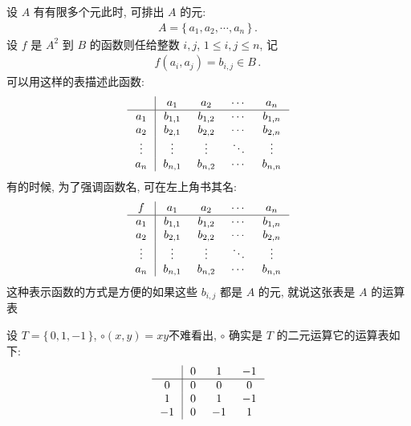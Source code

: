 \begin{remark}
    设 $A$ 有有限多个元\period 此时, 可排出 $A$ 的元:
    \begin{align*}
        A = \{\, a_1, a_2, \cdots, a_n \,\} \period
    \end{align*}
    设 $f$ 是 $A^2$ 到 $B$ 的函数\period 则任给整数 $i,j$, $1 \leq i,j \leq n$, 记
    \begin{align*}
        f(a_i, a_j) = b_{i,j} \in B \period
    \end{align*}
    可以用这样的表描述此函数:
    \begin{align*}
        \arraycolsep=0.25cm
        \begin{array}{c|cccc}
            \      & a_1     & a_2     & \cdots & a_n     \\ \hline
            a_1    & b_{1,1} & b_{1,2} & \cdots & b_{1,n} \\
            a_2    & b_{2,1} & b_{2,2} & \cdots & b_{2,n} \\
            \vdots & \vdots  & \vdots  & \ddots & \vdots  \\
            a_n    & b_{n,1} & b_{n,2} & \cdots & b_{n,n} \\
        \end{array}
    \end{align*}
    有的时候, 为了强调函数名, 可在左上角书其名:
    \begin{align*}
        \arraycolsep=0.25cm
        \begin{array}{c|cccc}
            f      & a_1     & a_2     & \cdots & a_n     \\ \hline
            a_1    & b_{1,1} & b_{1,2} & \cdots & b_{1,n} \\
            a_2    & b_{2,1} & b_{2,2} & \cdots & b_{2,n} \\
            \vdots & \vdots  & \vdots  & \ddots & \vdots  \\
            a_n    & b_{n,1} & b_{n,2} & \cdots & b_{n,n} \\
        \end{array}
    \end{align*}
    这种表示函数的方式是方便的\period 如果这些 $b_{i,j}$ 都是 $A$ 的元, 就说这张表是 $A$ 的运算表\period
\end{remark}

\begin{example}
    设 $T = \{\, 0,1,-1 \,\}$, $\circ (x,y) = xy$\period 不难看出, $\circ$ 确实是 $T$ 的二元运算\period 它的运算表如下:
    \begin{align*}
        \arraycolsep=0.25cm
        \begin{array}{c|ccc}
            \  & 0 & 1  & -1 \\ \hline
            0  & 0 & 0  & 0  \\
            1  & 0 & 1  & -1 \\
            -1 & 0 & -1 & 1  \\
        \end{array}
    \end{align*}
\end{example}

